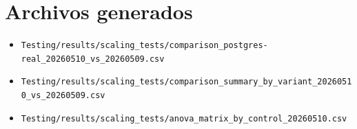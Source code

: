 \documentclass[11pt]{article}
\begin{document}
\section*{Archivos generados}
\begin{itemize}
  \item \texttt{Testing/results/scaling_tests/comparison_postgres-real_20260510_vs_20260509.csv}
  \item \texttt{Testing/results/scaling_tests/comparison_summary_by_variant_20260510_vs_20260509.csv}
  \item \texttt{Testing/results/scaling_tests/anova_matrix_by_control_20260510.csv}
\end{itemize}
\end{document}
